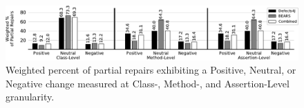 \documentclass[10pt, conference]{IEEEtran}
\newcommand\todo[1]{\textcolor{red}{#1}}
\newcommand\bears{\textsc{Bears}\xspace}
\begin{document}

\begin{figure}
        \includegraphics[width=\textwidth]{img/weighted_percent.pdf}
        \caption{Weighted percent of partial repairs exhibiting a {\normalfont
            Positive}, {\normalfont Neutral}, or {\normalfont Negative} change
          measured at Class-, Method-, and Assertion-Level granularity.}
        \label{fig:fitness}
\end{figure}
\end{document}
